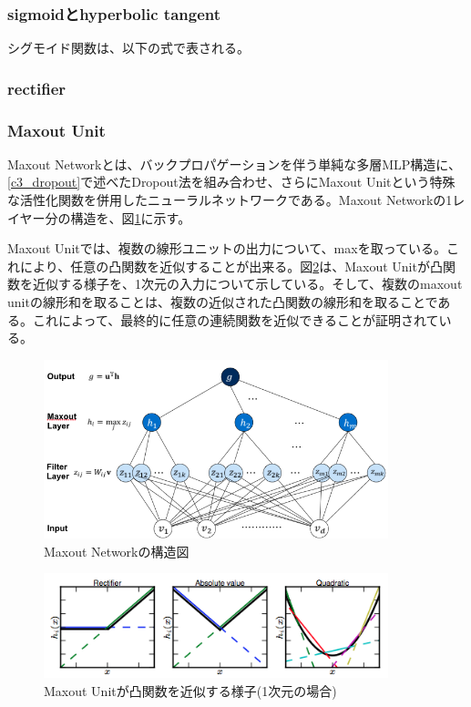 \subsubsection{sigmoidとhyperbolic tangent}
シグモイド関数は、以下の式で表される。

\subsubsection{rectifier}
\subsubsection{Maxout Unit}
Maxout Networkとは、バックプロパゲーションを伴う単純な多層MLP構造に、\ref{c3_dropout}で述べたDropout法を組み合わせ、さらにMaxout Unitという特殊な活性化関数を併用したニューラルネットワークである\cite{goodfellow2013maxout}。Maxout Networkの1レイヤー分の構造を、図\ref{c3_maxout_arch}に示す。\par
Maxout Unitでは、複数の線形ユニットの出力について、maxを取っている。これにより、任意の凸関数を近似することが出来る。図\ref{c3_maxout_app}は、Maxout Unitが凸関数を近似する様子を、1次元の入力について示している。そして、複数のmaxout unitの線形和を取ることは、複数の近似された凸関数の線形和を取ることである。これによって、最終的に任意の連続関数を近似できることが証明されている。
\begin{figure}[tbp]
 \begin{center}
  \includegraphics[width=100mm]{img/c3/maxout_arch}
 \end{center}
 \caption{Maxout Networkの構造図}
 \label{c3_maxout_arch}
\end{figure}
\begin{figure}[tbp]
 \begin{center}
  \includegraphics[width=100mm]{img/c3/maxout_app}
 \end{center}
 \caption{Maxout Unitが凸関数を近似する様子(1次元の場合)}
 \label{c3_maxout_app}
\end{figure}
